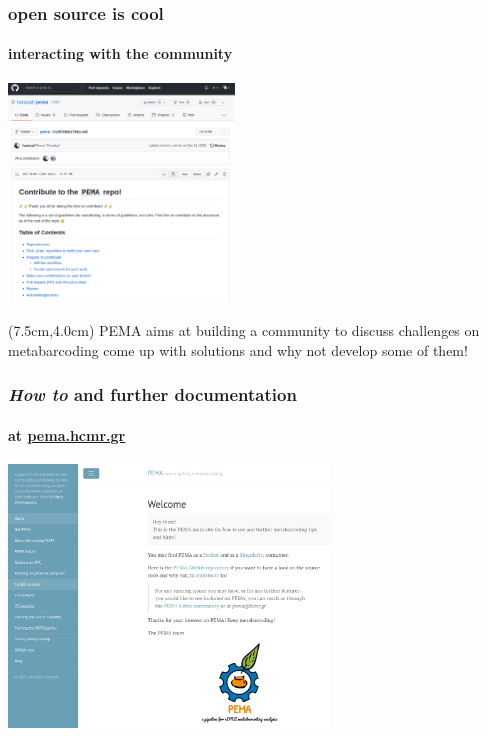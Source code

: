 \documentclass{beamer}
\begin{document}
\begin{frame}
\begin{singlespace}
\begin{textblock*}{5cm}
         \end{textblock*}


      \end{singlespace}
   \end{frame}

   \begin{frame}
   \frametitle{open source is cool}
      \framesubtitle{interacting with the community}

      \includegraphics[width=60mm]{resources/pema_contribution.png}

      \small
      \begin{textblock*}{5cm}(7.5cm,4.0cm) %
         PEMA aims at building a community 
         to discuss challenges on metabarcoding
         come up with solutions and why not 
         develop some of them! 
      \end{textblock*}

   \end{frame}
   \fi

   \begin{frame}
      \frametitle{\textit{How to} and further documentation}
      \framesubtitle{at \href{http://pema.hcmr.gr}{pema.hcmr.gr}}
      \includegraphics[width=85mm]{resources/pema_site.png}
   \end{frame}
\end{document}
